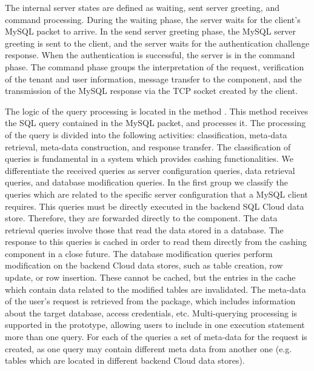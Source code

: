 The internal server states are defined as waiting, sent server greeting, and command processing. During the waiting phase, the server waits for the client's MySQL packet to arrive. In the send server greeting phase, the MySQL server greeting is sent to the client, and the server waits for the authentication challenge response. When the authentication is successful, the server is in the command phase. The command phase groups the interpretation of the request, verification of the tenant and user information, message transfer to the  component, and the transmission of the MySQL response via the \ac{TCP} socket created by the client.

The logic of the query processing is located in the method . This method receives the \ac{SQL} query contained in the MySQL packet, and processes it. The processing of the query is divided into the following activities: classification, meta-data retrieval, meta-data construction, and response transfer. The classification of queries is fundamental in a system which provides cashing functionalities. We differentiate the received queries as server configuration queries, data retrieval queries, and database modification queries. In the first group we classify the queries which are related to the specific server configuration that a MySQL client requires. This queries must be directly executed in the backend \ac{SQL} Cloud data store. Therefore, they are forwarded directly to the  component. The data retrieval queries involve those that read the data stored in a database. The response to this queries is cached in order to read them directly from the cashing component in a close future. The database modification queries perform modification on the backend Cloud data stores, such as table creation, row update, or row insertion. These cannot be cached, but the entries in the cache which contain data related to the modified tables are invalidated. The meta-data of the user's request is retrieved from the  package, which includes information about the target database, access credentials, etc. Multi-querying processing is supported in the prototype, allowing users to include in one execution statement more than one query. For each of the queries a set of meta-data for the request is created, as one query may contain different meta data from another one (e.g. tables which are located in different backend Cloud data stores). 

